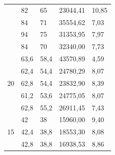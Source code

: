 \documentclass[a4paper,12pt]{article}
\begin{document}
\begin{center}
\begin{tabular}{|l|l|l|l|l|}
                          & 82                         & 65                         & 23044,41                                     & 10,85                                         \\
                          & 84                         & 71                         & 35554,62                                     & 7,03                                          \\
                          & 94                         & 75                         & 31353,95                                     & 7,97                                          \\
                          & 84                         & 70                         & 32340,00                                     & 7,73                                          \\ \hline
\multirow{5}{*}{20}       & 63,6                       & 58,4                       & 43570,89                                     & 4,59                                          \\
                          & 62,4                       & 54,4                       & 24780,29                                     & 8,07                                          \\
                          & 62,8                       & 54,4                       & 23832,90                                     & 8,39                                          \\
                          & 61,2                       & 53,6                       & 24775,05                                     & 8,07                                          \\
                          & 62,8                       & 55,2                       & 26911,45                                     & 7,43                                          \\ \hline
\multirow{5}{*}{15}       & 42                         & 38                         & 15960,00                                     & 9,40                                          \\
                          & 42,4                       & 38,8                       & 18553,30                                     & 8,08                                          \\
                          & 42,8                       & 38,8                       & 16938,53                                     & 8,86                                          \\

\end{tabular}
\end{center}
\end{document}
